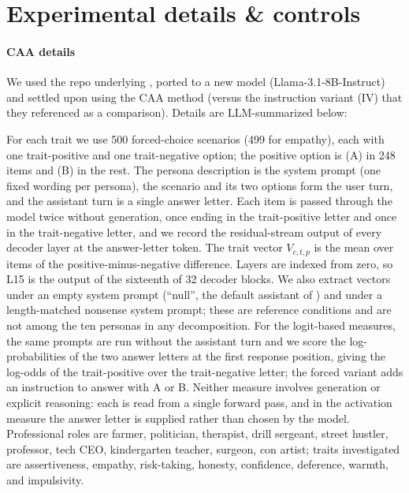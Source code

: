 \documentclass{article}
\begin{document}



\appendix

\section{Experimental details \& controls}
\label{app:details}

\paragraph{CAA details}
We used the repo underlying \citet{davies2026personas}, ported to a new model (Llama-3.1-8B-Instruct) and settled upon using the CAA method (versus the instruction variant (IV) that they referenced as a comparison). Details are LLM-summarized below:

For each trait we use 500 forced-choice scenarios (499 for empathy), each with one trait-positive and one trait-negative option; the positive option is (A) in 248 items and (B) in the rest. The persona description is the system prompt (one fixed wording per persona), the scenario and its two options form the user turn, and the assistant turn is a single answer letter. Each item is passed through the model twice without generation, once ending in the trait-positive letter and once in the trait-negative letter, and we record the residual-stream output of every decoder layer at the answer-letter token. The trait vector $V_{c,t,p}$ is the mean over items of the positive-minus-negative difference. Layers are indexed from zero, so L15 is the output of the sixteenth of 32 decoder blocks. We also extract vectors under an empty system prompt (``null'', the default assistant of \citet{lu2026assistant}) and under a length-matched nonsense system prompt; these are reference conditions and are not among the ten personas in any decomposition. For the logit-based measures, the same prompts are run without the assistant turn and we score the log-probabilities of the two answer letters at the first response position, giving the log-odds of the trait-positive over the trait-negative letter; the forced variant adds an instruction to answer with A or B. Neither measure involves generation or explicit reasoning: each is read from a single forward pass, and in the activation measure the answer letter is supplied rather than chosen by the model. Professional roles are farmer, politician, therapist, drill sergeant, street hustler, professor, tech CEO, kindergarten teacher, surgeon, con artist; traits investigated are assertiveness, empathy, risk-taking, honesty, confidence, deference, warmth, and impulsivity.
\end{document}

